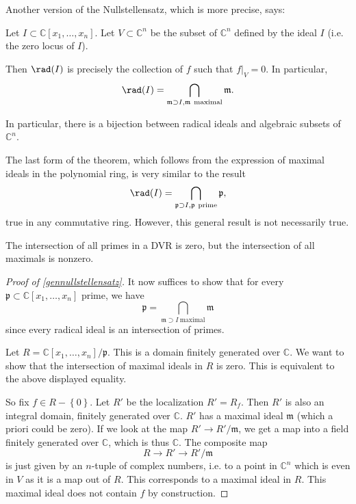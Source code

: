  Another version of the Nullstellensatz, which is
more precise, says:

\begin{theorem} \label{gennullstellensatz}
Let $I \subset \mathbb{C}[x_1, \dots, x_n]$. Let $V \subset \mathbb{C}^n$ be
the subset of $\mathbb{C}^n$ defined by the ideal $I$ (i.e. the zero locus of
$I$).

Then $\rad(I)$ is precisely the collection of $f$ such that $f|_V = 0$. In
particular,
\[ \rad(I) = \bigcap_{\mathfrak{m} \supset I, \mathfrak{m} \
\mathrm{maximal}} \mathfrak{m}.  \]
\end{theorem}

In particular, there is a bijection between radical ideals and algebraic
subsets of $\mathbb{C}^n$.

The last form of the theorem, which follows from the expression of maximal
ideals in the polynomial ring, is very similar to the result
\[ \rad(I) = \bigcap_{\mathfrak{p} \supset I, \mathfrak{p} \
\mathrm{prime}} \mathfrak{p},  \]
true in any commutative ring. However, this general result is not necessarily
true.

\begin{example}
The intersection of all primes in a DVR is zero, but the intersection of all
maximals is nonzero.
\end{example}

\begin{proof}[Proof of \cref{gennullstellensatz}] 
It now suffices to show that for every $\mathfrak{p} \subset \mathbb{C}[x_1,
\dots, x_n]$ prime, we have
\[ \mathfrak{p} = \bigcap_{\mathfrak{m} \supset I \ \mathrm{maximal}}
\mathfrak{m}  \]
since every radical ideal is an intersection of primes.

Let $R = \mathbb{C}[x_1, \dots,
x_n]/\mathfrak{p}$. This is a domain finitely generated over $\mathbb{C}$. We
want to show that the intersection of maximal ideals in $R$ is zero. This is
equivalent to the above displayed equality.

So fix $f \in R - \left\{0\right\}$. Let $R'$ be the localization $R'= R_f$. Then $R'$ is also an
integral domain, finitely generated over $\mathbb{C}$.	$R'$ has a maximal
ideal $\mathfrak{m}$ (which a priori could be zero). If
we look at the map $R' \to R'/\mathfrak{m}$, we get a map into a field
finitely generated
over $\mathbb{C}$, which is thus $\mathbb{C}$.
The composite map
\[ R \to  R' \to R'/\mathfrak{m}   \]
is just given by an $n$-tuple of complex numbers, i.e. to a point in
$\mathbb{C}^n$ which is even in $V$ as it is a map out of $R$. This corresponds
to a maximal ideal in $R$.
This maximal ideal does not contain $f$ by construction.
\end{proof}

